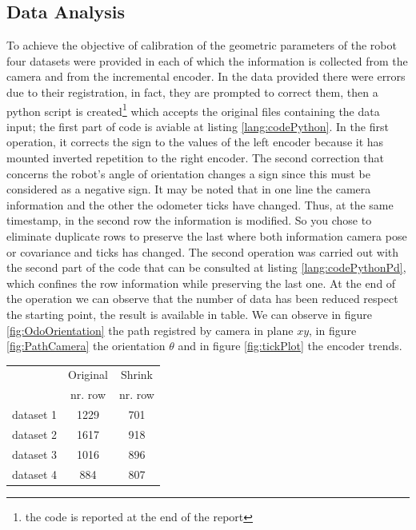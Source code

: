 \subsection{Data Analysis}
To achieve the objective of calibration of the geometric parameters of the robot four datasets were provided in each of which the information is collected from the camera and from the incremental encoder.
In the data provided there were errors due to their registration, in fact, they are prompted to correct them, then a python script is created\footnote{the code is reported at the end of the report} which accepts the original files containing the data input; the first part of code is aviable at listing \ref{lang:codePython}.
In the first operation, it corrects the sign to the values of the left encoder because it has mounted inverted repetition to the right encoder.
The second correction that concerns the robot's angle of orientation changes a sign since this must be considered as a negative sign.
It may be noted that in one line the camera information and the other the odometer ticks have changed. 
Thus, at the same timestamp, in the second row the information is modified.
So you chose to eliminate duplicate rows to preserve the last where both information camera pose or covariance and ticks has changed.
The second operation was carried out with the second part of the code that can be consulted at listing \ref{lang:codePythonPd}, which confines the row information while preserving the last one.
At the end of the operation we can observe that the number of data has been reduced respect the starting point, the result is available in table.
We can observe in figure \ref{fig:OdoOrientation} the path registred by camera in plane $xy$, in figure \ref{fig:PathCamera} the orientation $\theta$ and in figure \ref{fig:tickPlot} the encoder trends.
\begin{table}[!htb]
\centering
\begin{tabular}{lcc}
\hline
			&	Original		&	Shrink\\
			&	nr. row		&	nr. row\\
\hline
dataset 1	&	1229			& 	701\\
dataset 2	&	1617			& 	918\\
dataset 3	&	1016			& 	896\\
dataset 4	&	884			& 	807\\
\hline
\end{tabular}
\end{table}

